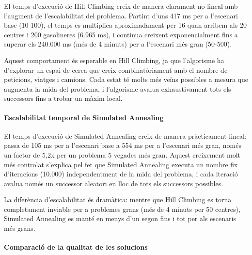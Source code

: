 \vspace{0.5cm}

\vspace{0.5cm}

El temps d'execució de Hill Climbing creix de manera clarament no lineal amb l'augment de l'escalabilitat del problema. Partint d'uns 417 ms per a l'escenari base (10-100), el temps es multiplica aproximadament per 16 quan arribem als 20 centres i 200 gasolineres (6.965 ms), i continua creixent exponencialment fins a superar els 240.000 ms (més de 4 minuts) per a l'escenari més gran (50-500).

Aquest comportament és esperable en Hill Climbing, ja que l'algorisme ha d'explorar un espai de cerca que creix combinatòriament amb el nombre de peticions, viatges i camions. Cada estat té molts més veïns possibles a mesura que augmenta la mida del problema, i l'algorisme avalua exhaustivament tots els successors fins a trobar un màxim local.

\paragraph{Escalabilitat temporal de Simulated Annealing}


\vspace{0.5cm}

\vspace{0.5cm}

\vspace{0.5cm}

El temps d'execució de Simulated Annealing creix de manera pràcticament lineal: passa de 105 ms per a l'escenari base a 554 ms per a l'escenari més gran, només un factor de 5,2x per un problema 5 vegades més gran. Aquest creixement molt més controlat s'explica pel fet que Simulated Annealing executa un nombre fix d'iteracions (10.000) independentment de la mida del problema, i cada iteració avalua només un successor aleatori en lloc de tots els successors possibles.

La diferència d'escalabilitat és dramàtica: mentre que Hill Climbing es torna completament inviable per a problemes grans (més de 4 minuts per 50 centres), Simulated Annealing es manté en menys d'un segon fins i tot per als escenaris més grans.

\paragraph{Comparació de la qualitat de les solucions}

